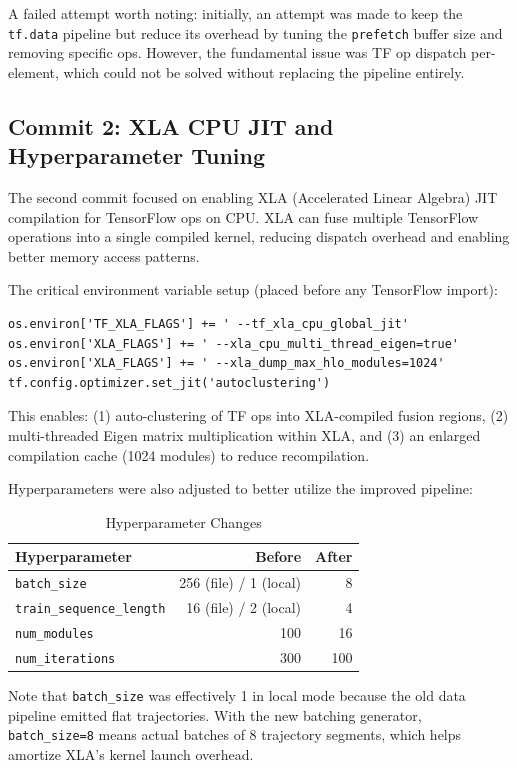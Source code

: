 \documentclass[10pt]{article}
\begin{document}
A failed attempt worth noting: initially, an attempt was made to keep the \texttt{tf.data} pipeline but reduce its overhead by tuning the \texttt{prefetch} buffer size and removing specific ops. However, the fundamental issue was TF op dispatch per-element, which could not be solved without replacing the pipeline entirely.

\subsection{Commit 2: XLA CPU JIT and Hyperparameter Tuning}

The second commit focused on enabling XLA (Accelerated Linear Algebra) JIT compilation for TensorFlow ops on CPU. XLA can fuse multiple TensorFlow operations into a single compiled kernel, reducing dispatch overhead and enabling better memory access patterns.

The critical environment variable setup (placed before any TensorFlow import):

\begin{lstlisting}
os.environ['TF_XLA_FLAGS'] += ' --tf_xla_cpu_global_jit'
os.environ['XLA_FLAGS'] += ' --xla_cpu_multi_thread_eigen=true'
os.environ['XLA_FLAGS'] += ' --xla_dump_max_hlo_modules=1024'
tf.config.optimizer.set_jit('autoclustering')
\end{lstlisting}

This enables: (1) auto-clustering of TF ops into XLA-compiled fusion regions, (2) multi-threaded Eigen matrix multiplication within XLA, and (3) an enlarged compilation cache (1024 modules) to reduce recompilation.

Hyperparameters were also adjusted to better utilize the improved pipeline:

\begin{table}[H]
\centering
\caption{Hyperparameter Changes}
\begin{tabular}{lrr}
\toprule
Hyperparameter & Before & After \\
\midrule
\texttt{batch\_size} & 256 (file) / 1 (local) & 8 \\
\texttt{train\_sequence\_length} & 16 (file) / 2 (local) & 4 \\
\texttt{num\_modules} & 100 & 16 \\
\texttt{num\_iterations} & 300 & 100 \\
\bottomrule
\end{tabular}
\end{table}

Note that \texttt{batch\_size} was effectively 1 in local mode because the old data pipeline emitted flat trajectories. With the new batching generator, \texttt{batch\_size=8} means actual batches of 8 trajectory segments, which helps amortize XLA's kernel launch overhead.
\end{document}
